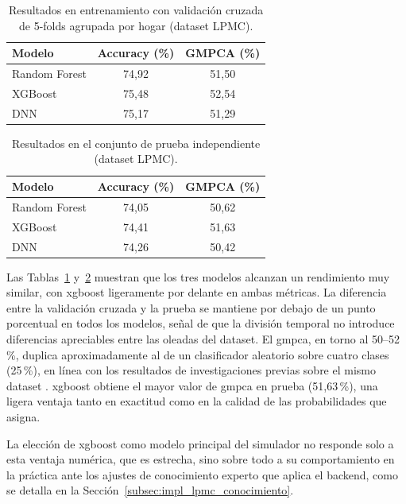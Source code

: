 \begin{table}[htbp]
  \caption{Resultados en entrenamiento con validación cruzada de 5-folds agrupada por hogar (dataset LPMC).}
  \label{tab:lpmc_train_results}
  \centering
  \begin{tabular}{lcc}
    \toprule
    \textbf{Modelo} & \textbf{Accuracy (\%)} & \textbf{GMPCA (\%)} \\
    \midrule
    Random Forest & 74,92 & 51,50 \\
    XGBoost       & 75,48 & 52,54 \\
    DNN           & 75,17 & 51,29 \\
    \bottomrule
  \end{tabular}
\end{table}
\vspace{-10mm}
\begin{table}[htbp]
  \caption{Resultados en el conjunto de prueba independiente (dataset LPMC).}
  \label{tab:lpmc_test_results}
  \centering
  \begin{tabular}{lcc}
    \toprule
    \textbf{Modelo} & \textbf{Accuracy (\%)} & \textbf{GMPCA (\%)} \\
    \midrule
    Random Forest & 74,05 & 50,62 \\
    XGBoost       & 74,41 & 51,63 \\
    DNN           & 74,26 & 50,42 \\
    \bottomrule
  \end{tabular}
\end{table}

\newpage
Las Tablas~\ref{tab:lpmc_train_results} y~\ref{tab:lpmc_test_results} muestran que los tres modelos alcanzan un rendimiento muy similar, con \gls{xgboost} ligeramente por delante en ambas métricas. La diferencia entre la validación cruzada y la prueba se mantiene por debajo de un punto porcentual en todos los modelos, señal de que la división temporal no introduce diferencias apreciables entre las oleadas del dataset. El \gls{gmpca}, en torno al 50--52\,\%, duplica aproximadamente al de un clasificador aleatorio sobre cuatro clases (25\,\%), en línea con los resultados de investigaciones previas sobre el mismo dataset \cite{MartinBaos2023TRC}. \gls{xgboost} obtiene el mayor valor de \gls{gmpca} en prueba (51,63\,\%), una ligera ventaja tanto en exactitud como en la calidad de las probabilidades que asigna.\newline

La elección de \gls{xgboost} como modelo principal del simulador no responde solo a esta ventaja numérica, que es estrecha, sino sobre todo a su comportamiento en la práctica ante los ajustes de conocimiento experto que aplica el backend, como se detalla en la Sección~\ref{subsec:impl_lpmc_conocimiento}.
\vspace{-5mm}
